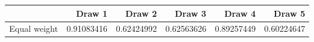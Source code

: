 \begin{tabular}{lrrrrr}
\toprule
 & Draw 1 & Draw 2 & Draw 3 & Draw 4 & Draw 5 \\
\midrule
Equal weight & 0.91083416 & 0.62424992 & 0.62563626 & 0.89257449 & 0.60224647 \\
\bottomrule
\end{tabular}
